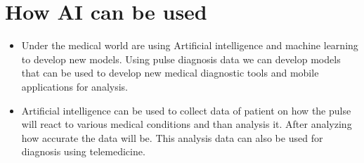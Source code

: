 \documentclass[10pt,a4paper,twoside]{article}
\begin{document}
\section{How AI can be used}

\begin{itemize}
\item Under the medical world are using Artificial intelligence and machine learning to develop new models. Using pulse diagnosis data we can develop models that can be used to develop new medical diagnostic tools and mobile applications for analysis.
\end{itemize}

\begin{itemize}
\item Artificial intelligence can be used to collect data of patient on how the pulse will react to various medical conditions and than analysis it. After analyzing how accurate the data will be. This analysis data can also be used for diagnosis using telemedicine.
\end{itemize}
\end{document}
